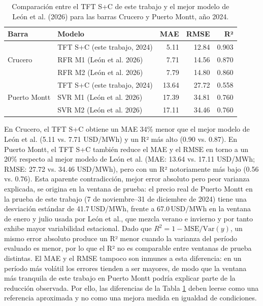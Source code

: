 \begin{table}[htbp]
    \centering
    \begin{tabular}{llrrr}
        \toprule
        Barra & Modelo & MAE & RMSE & R² \\
        \midrule
        \multirow{3}{*}{Crucero}
            & TFT S+C (este trabajo, 2024) & 5.11  & 12.84 & 0.903 \\
            & RFR M1 (León et al. 2026)    & 7.71  & 14.56 & 0.870 \\
            & RFR M2 (León et al. 2026)    & 7.79  & 14.80 & 0.860 \\
        \midrule
        \multirow{3}{*}{Puerto Montt}
            & TFT S+C (este trabajo, 2024) & 13.64 & 27.72 & 0.558 \\
            & SVR M1 (León et al. 2026)    & 17.39 & 34.81 & 0.760 \\
            & SVR M2 (León et al. 2026)    & 17.11 & 34.46 & 0.760 \\
        \bottomrule
    \end{tabular}
    \caption{Comparación entre el TFT S+C de este trabajo y el mejor modelo de León et al. (2026) para las barras Crucero y Puerto Montt, año 2024.}
    \label{tab:crucero_leon}
\end{table}

En Crucero, el TFT S+C obtiene un MAE 34\% menor que el mejor modelo de León et al. (5.11 vs. 7.71 USD/MWh) y un R² más alto (0.90 vs. 0.87). En Puerto Montt, el TFT S+C también reduce el MAE y el RMSE en torno a un 20\% respecto al mejor modelo de León et al. (MAE: 13.64 vs. 17.11 USD/MWh; RMSE: 27.72 vs. 34.46 USD/MWh), pero con un R² notoriamente más bajo (0.56 vs. 0.76). Esta aparente contradicción, mejor error absoluto pero peor varianza explicada, se origina en la ventana de prueba: el precio real de Puerto Montt en la prueba de este trabajo (7 de noviembre--31 de diciembre de 2024) tiene una desviación estándar de 41.7\,USD/MWh, frente a 67.0\,USD/MWh en la ventana de enero y julio usada por León et al., que mezcla verano e invierno y por tanto exhibe mayor variabilidad estacional. Dado que $R^2 = 1 - \text{MSE}/\text{Var}(y)$, un mismo error absoluto produce un R² menor cuando la varianza del período evaluado es menor, por lo que el R² no es comparable entre ventanas de prueba distintas. El MAE y el RMSE tampoco son inmunes a esta diferencia: en un período más volátil los errores tienden a ser mayores, de modo que la ventana más tranquila de este trabajo en Puerto Montt podría explicar parte de la reducción observada. Por ello, las diferencias de la Tabla \ref{tab:crucero_leon} deben leerse como una referencia aproximada y no como una mejora medida en igualdad de condiciones.

